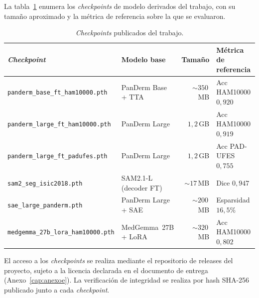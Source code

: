 La tabla~\ref{tab:anexoa-checkpoints} enumera los
\emph{checkpoints} de modelo derivados del trabajo, con su tamaño
aproximado y la métrica de referencia sobre la que se evaluaron.

\begin{table}[H]
\centering
\footnotesize
\setlength{\tabcolsep}{4pt}
\renewcommand{\arraystretch}{0.95}
\caption{\emph{Checkpoints} publicados del trabajo.}
\label{tab:anexoa-checkpoints}
\begin{tabular}{llrl}
\hline
\emph{Checkpoint}                          & Modelo base       & Tamaño & Métrica de referencia \\
\hline
\texttt{panderm\_base\_ft\_ham10000.pth}   & PanDerm Base + TTA & $\sim 350$\,MB & Acc HAM10000 $0{,}920$ \\
\texttt{panderm\_large\_ft\_ham10000.pth}  & PanDerm Large     & $1{,}2$\,GB & Acc HAM10000 $0{,}919$ \\
\texttt{panderm\_large\_ft\_padufes.pth}   & PanDerm Large     & $1{,}2$\,GB & Acc PAD-UFES $0{,}755$ \\
\texttt{sam2\_seg\_isic2018.pth}           & SAM2.1-L (decoder FT) & $\sim 17$\,MB & Dice $0{,}947$ \\
\texttt{sae\_large\_panderm.pth}           & PanDerm Large + SAE & $\sim 200$\,MB & Esparsidad $16{,}5\%$ \\
\texttt{medgemma\_27b\_lora\_ham10000.pth} & MedGemma~27B + LoRA & $\sim 320$\,MB & Acc HAM10000 $0{,}802$ \\
\hline
\end{tabular}
\end{table}

El acceso a los \emph{checkpoints} se realiza mediante el
repositorio de releases del proyecto, sujeto a la licencia
declarada en el documento de entrega
(Anexo~\ref{cap:anexoe}). La verificación de integridad se
realiza por hash SHA-256 publicado junto a cada \emph{checkpoint}.
